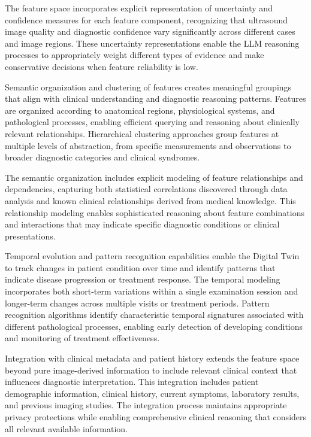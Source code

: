 The feature space incorporates explicit representation of uncertainty and confidence measures for each feature component, recognizing that ultrasound image quality and diagnostic confidence vary significantly across different cases and image regions. These uncertainty representations enable the LLM reasoning processes to appropriately weight different types of evidence and make conservative decisions when feature reliability is low.

Semantic organization and clustering of features creates meaningful groupings that align with clinical understanding and diagnostic reasoning patterns. Features are organized according to anatomical regions, physiological systems, and pathological processes, enabling efficient querying and reasoning about clinically relevant relationships. Hierarchical clustering approaches group features at multiple levels of abstraction, from specific measurements and observations to broader diagnostic categories and clinical syndromes.

The semantic organization includes explicit modeling of feature relationships and dependencies, capturing both statistical correlations discovered through data analysis and known clinical relationships derived from medical knowledge. This relationship modeling enables sophisticated reasoning about feature combinations and interactions that may indicate specific diagnostic conditions or clinical presentations.

Temporal evolution and pattern recognition capabilities enable the Digital Twin to track changes in patient condition over time and identify patterns that indicate disease progression or treatment response. The temporal modeling incorporates both short-term variations within a single examination session and longer-term changes across multiple visits or treatment periods. Pattern recognition algorithms identify characteristic temporal signatures associated with different pathological processes, enabling early detection of developing conditions and monitoring of treatment effectiveness.

Integration with clinical metadata and patient history extends the feature space beyond pure image-derived information to include relevant clinical context that influences diagnostic interpretation. This integration includes patient demographic information, clinical history, current symptoms, laboratory results, and previous imaging studies. The integration process maintains appropriate privacy protections while enabling comprehensive clinical reasoning that considers all relevant available information.


